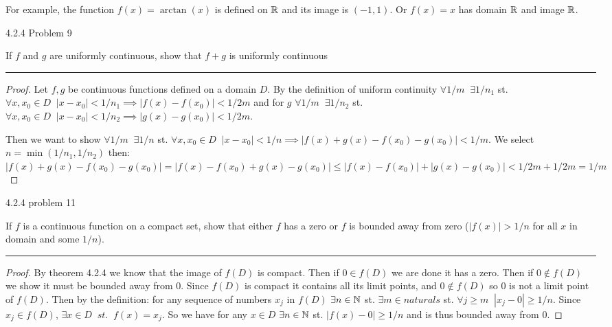 \documentclass[11pt]{article}
\renewcommand{\sp}{\; \;}
\begin{document}
For example, the function $f(x) = \arctan(x)$ is defined on $\mathbb{R}$ and its image is $(-1,1)$. Or $f(x) = x$ has domain $\mathbb{R}$ and image $\mathbb{R}$.


 4.2.4 Problem 9

If $f$ and $g$ are uniformly continuous, show that $f+g$ is uniformly continuous

\hrule

\begin{proof}

Let $f, g$ be continuous functions defined on a domain $D$. By the definition of uniform continuity $\forall 1/m \sp \exists 1/n_1$ st. $\forall x, x_0 \in D \sp |x - x_0| < 1/n_1 \implies |f(x) - f(x_0)| < 1/2m$ 
and for $g$ $\forall 1/m \sp \exists 1/n_2$ st. $\forall x, x_0 \in D \sp |x - x_0| < 1/n_2 \implies |g(x) - g(x_0)| < 1/2m$. 

Then we want to show $\forall 1/m \sp \exists 1/n$ st. $\forall x, x_0 \in D \sp |x - x_0| < 1/n \implies |f(x) + g(x) - f(x_0) - g(x_0)| < 1/m$. 
We select $n = \min(1/n_1, 1/n_2)$ then: 
$|f(x) + g(x) - f(x_0) - g(x_0)| = |f(x) - f(x_0) + g(x) - g(x_0)| \leq |f(x) - f(x_0)| + |g(x) - g(x_0)| < 1/2m + 1/2m = 1/m$
\end{proof}





 4.2.4 problem 11

If $f$ is a continuous function on a compact set, show that either $f$ has a zero or $f$ is bounded away from zero ($|f(x)| > 1/n$ for all $x$ in domain and some $1/n$). 

\hrule



\begin{proof}

By theorem 4.2.4 we know that the image of $f(D)$ is compact. Then if $0 \in f(D)$ we are done it has a zero. Then if $0 \notin f(D)$ we show it must be bounded away from 0. Since $f(D)$ is compact it contains all its limit points, and $0 \notin f(D)$ so $0$ is not a limit point of $f(D)$. Then by the definition: for any sequence of numbers $x_j$ in $f(D)$ $\exists n \in \mathbb{N}$ st. $\exists m \in naturals$ st. $\forall j \geq m \sp |x_j - 0| \geq 1/n$. Since $x_j \in f(D)$, $\exists x \in D \sp st. \sp f(x) = x_j$. So we have for any $x \in D$ $\exists n \in \mathbb{N}$ st. $|f(x) - 0| \geq 1/n$ and is thus bounded away from 0.

\end{proof}
\end{document}
